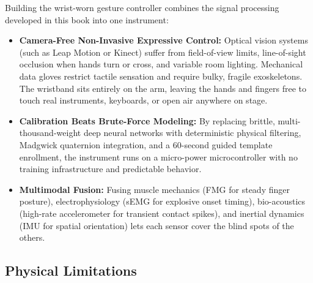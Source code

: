 Building the wrist-worn gesture controller combines the signal processing developed in this book into one instrument:
\begin{itemize}
  \item \textbf{Camera-Free Non-Invasive Expressive Control:} Optical vision systems (such as Leap Motion or Kinect) suffer from field-of-view limits, line-of-sight occlusion when hands turn or cross, and variable room lighting. Mechanical data gloves restrict tactile sensation and require bulky, fragile exoskeletons. The wristband sits entirely on the arm, leaving the hands and fingers free to touch real instruments, keyboards, or open air anywhere on stage.
  \item \textbf{Calibration Beats Brute-Force Modeling:} By replacing brittle, multi-thousand-weight deep neural networks with deterministic physical filtering, Madgwick quaternion integration, and a 60-second guided template enrollment, the instrument runs on a micro-power microcontroller with no training infrastructure and predictable behavior.
  \item \textbf{Multimodal Fusion:} Fusing muscle mechanics (FMG for steady finger posture), electrophysiology (sEMG for explosive onset timing), bio-acoustics (high-rate accelerometer for transient contact spikes), and inertial dynamics (IMU for spatial orientation) lets each sensor cover the blind spots of the others.
\end{itemize}

\subsection{Physical Limitations}

